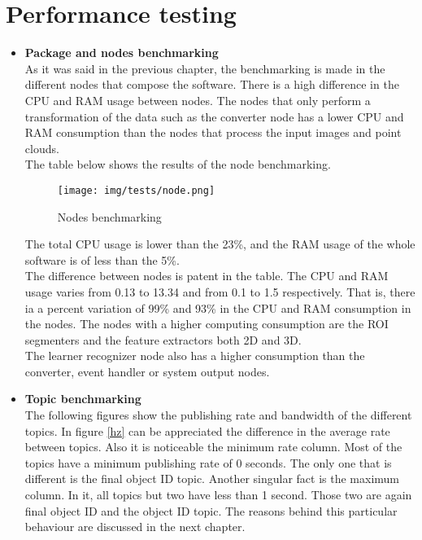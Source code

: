 \section{Performance testing}

	\begin{itemize}
		\item{\textbf{Package and nodes benchmarking}}
		\\

			As it was said in the previous chapter, the benchmarking is made in the different nodes that compose the software. 
			There is a high difference in the CPU and RAM usage between nodes.
			The nodes that only perform a transformation of the data such as the converter node has a lower CPU and RAM consumption than the nodes that process the input images and point clouds. 
			\\

			The table below shows the results of the node benchmarking. 

			\begin{figure}[h]
				\begin{center}
			    \texttt{[image: img/tests/node.png]}
				\caption[Nodes benchmarking]{Nodes benchmarking}
				\label{nodes}
				\end{center}
			\end{figure}

			The total CPU usage is lower than the 23\%, and the RAM usage of the whole software is of less than the 5\%. 
			\\


			The difference between nodes is patent in the table.
			The CPU and RAM usage varies from  0.13 to 13.34 and from 0.1 to 1.5 respectively. 
			That is, there ia a percent variation of 99\% and  93\%  in the CPU and RAM consumption in the nodes. 
			The nodes with a higher computing consumption are the ROI segmenters and the feature extractors both 2D and 3D.
			\\

			The learner recognizer node also has a higher consumption than the converter, event handler or system output nodes. 
			
			\newpage

		\item{\textbf{Topic benchmarking}}\\

			The following figures show the publishing rate and bandwidth of the different topics. 
			In figure \ref{hz} can be appreciated the difference in the average rate between topics. 
			Also it is noticeable the minimum rate column. 
			Most of the topics have a minimum publishing rate of 0 seconds.
			The only one that is different is the final object ID topic. 
			Another singular fact is the maximum column. 
			In it, all topics but two have less than 1 second. 
			Those two are again final object ID and the object ID topic. 
			The reasons behind this particular behaviour are discussed in the next chapter. 


\end{itemize}
